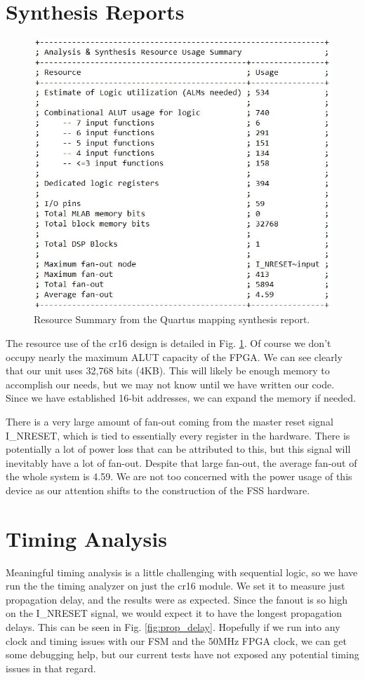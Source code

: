 \documentclass[conference]{IEEEtran}
\begin{document}
\section{Synthesis Reports}
\begin{figure}[t]
    \centering
    \includegraphics[scale=0.65]{resources/figures/resource_summary.jpg}
    \caption{Resource Summary from the Quartus mapping synthesis report.}
    \label{fig:resource_summary}
\end{figure}

The resource use of the cr16 design is detailed in Fig. \ref{fig:resource_summary}. Of course we don't occupy nearly the maximum ALUT capacity of the FPGA. We can see clearly that our unit uses 32,768 bits (4KB). This will likely be enough memory to accomplish our needs, but we may not know until we have written our code. Since we have established 16-bit addresses, we can expand the memory if needed.

There is a very large amount of fan-out coming from the master reset signal I\_NRESET, which is tied to essentially every register in the hardware. There is potentially a lot of power loss that can be attributed to this, but this signal will inevitably have a lot of fan-out. Despite that large fan-out, the average fan-out of the whole system is 4.59. We are not too concerned with the power usage of this device as our attention shifts to the construction of the FSS hardware.
\section{Timing Analysis}
Meaningful timing analysis is a little challenging with sequential logic, so we have run the the timing analyzer on just the cr16 module. We set it to measure just propagation delay, and the results were as expected. Since the fanout is so high on the I\_NRESET signal, we would expect it to have the longest propagation delays. This can be seen in Fig. \ref{fig:prop_delay}. Hopefully if we run into any clock and timing issues with our FSM and the 50MHz FPGA clock, we can get some debugging help, but our current tests have not exposed any potential timing issues in that regard.
\end{document}
